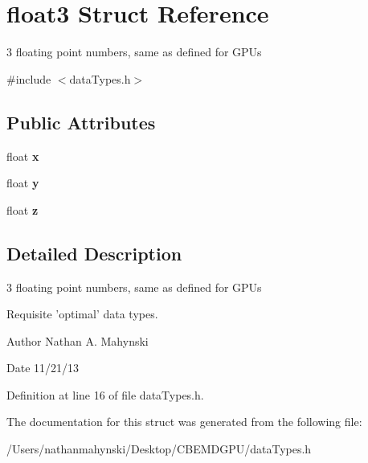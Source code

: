 \hypertarget{structfloat3}{\section{float3 Struct Reference}
\label{structfloat3}
}


3 floating point numbers, same as defined for G\-P\-Us  




{\ttfamily \#include $<$data\-Types.\-h$>$}

\subsection*{Public Attributes}
\begin{DoxyCompactItemize}
\item 
\hypertarget{structfloat3_af621f02abb1c788738fe61ea9807ff9c}{float {\bfseries x}}\label{structfloat3_af621f02abb1c788738fe61ea9807ff9c}

\item 
\hypertarget{structfloat3_aa6147d421a81889971f8c66aa92abf0d}{float {\bfseries y}}\label{structfloat3_aa6147d421a81889971f8c66aa92abf0d}

\item 
\hypertarget{structfloat3_a772dffd42d89f350c5a1b766c4703245}{float {\bfseries z}}\label{structfloat3_a772dffd42d89f350c5a1b766c4703245}

\end{DoxyCompactItemize}


\subsection{Detailed Description}
3 floating point numbers, same as defined for G\-P\-Us 

Requisite 'optimal' data types. \begin{DoxyAuthor}{Author}
Nathan A. Mahynski 
\end{DoxyAuthor}
\begin{DoxyDate}{Date}
11/21/13 
\end{DoxyDate}


Definition at line 16 of file data\-Types.\-h.



The documentation for this struct was generated from the following file\-:\begin{DoxyCompactItemize}
\item 
/\-Users/nathanmahynski/\-Desktop/\-C\-B\-E\-M\-D\-G\-P\-U/data\-Types.\-h\end{DoxyCompactItemize}

